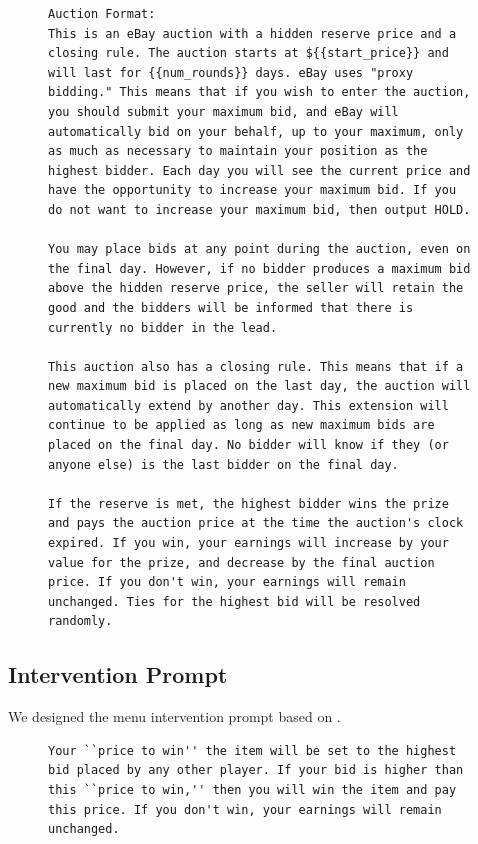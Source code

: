 \begin{figure}[H]
\centering
\begin{minipage}{0.95\textwidth}
\begin{lstlisting}
Auction Format:
This is an eBay auction with a hidden reserve price and a closing rule. The auction starts at ${{start_price}} and will last for {{num_rounds}} days. eBay uses "proxy bidding." This means that if you wish to enter the auction, you should submit your maximum bid, and eBay will automatically bid on your behalf, up to your maximum, only as much as necessary to maintain your position as the highest bidder. Each day you will see the current price and have the opportunity to increase your maximum bid. If you do not want to increase your maximum bid, then output HOLD.

You may place bids at any point during the auction, even on the final day. However, if no bidder produces a maximum bid above the hidden reserve price, the seller will retain the good and the bidders will be informed that there is currently no bidder in the lead.

This auction also has a closing rule. This means that if a new maximum bid is placed on the last day, the auction will automatically extend by another day. This extension will continue to be applied as long as new maximum bids are placed on the final day. No bidder will know if they (or anyone else) is the last bidder on the final day.

If the reserve is met, the highest bidder wins the prize and pays the auction price at the time the auction's clock expired. If you win, your earnings will increase by your value for the prize, and decrease by the final auction price. If you don't win, your earnings will remain unchanged. Ties for the highest bid will be resolved randomly.
\end{lstlisting}
\end{minipage}
\label{fig:sealbid_prompt}
\end{figure}




\subsection{Intervention Prompt}\label{app:intervention}

We designed the menu intervention prompt based on \citet{gonczarowski2023strategyproofness}.
\begin{figure}[H]
\centering
\begin{minipage}{0.95\textwidth}
\begin{lstlisting}
Your ``price to win'' the item will be set to the highest bid placed by any other player. If your bid is higher than this ``price to win,'' then you will win the item and pay this price. If you don't win, your earnings will remain unchanged.
\end{lstlisting}
\end{minipage}
\label{fig:sealbid_prompt}
\end{figure}

